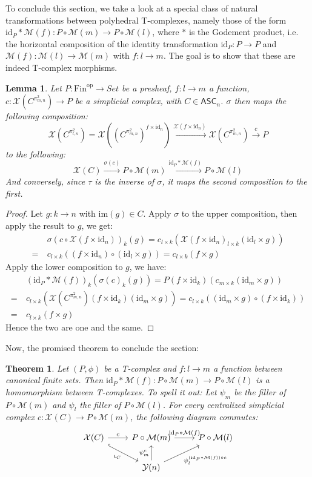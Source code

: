 \documentclass{article}
\newtheorem{theorem}{Theorem}[subsection]
\newtheorem{lemma}{Lemma}[subsection]
\theoremstyle{remark}
\theoremstyle{definition}
\newcommand{\Fin}{\mathrm{Fin}}
\newcommand{\op}{\mathrm{op}}
\newcommand{\ASC}{\mathsf{ASC}}
\newcommand{\im}{\mathrm{im}}
\newcommand{\id}{\mathrm{id}}
\newcommand{\Y}{\mathcal Y}
\newcommand{\X}{\mathcal X}
\newcommand{\M}{\mathcal M}
\begin{document}
	To conclude this section, we take a look at a special class of natural transformations between polyhedral T-complexes, namely those of the form $\id_P*\M(f):P\circ\M(m)\to P\circ\M(l)$, where $*$ is the Godement product, i.e. the horizontal composition of the identity transformation $\id_P:P\to P$ and $\M(f):\M(l)\to\M(m)$ with $f:l\to m$. The goal is to show that these are indeed T-complex morphisms.
	\begin{lemma}\label{sigexch}
		Let $P:\Fin^\op\to Set$ be a presheaf, $f:l\to m$ a function, $c:\X(C^{\pi^2_{m,n}})\to P$ be a simplicial complex, with $C\in\ASC_n$. $\sigma$ then maps the following composition:
		\[\X(C^{\pi^2_{l,n}})=\X((C^{\pi^2_{m,n}})^{f\times\id_n})\xrightarrow{\X(f\times\id_n)}\X(C^{\pi^2_{m,n}})\xrightarrow{c}P\]
		to the following:
		\[\X(C)\xrightarrow{\sigma(c)}P\circ\M(m)\xrightarrow{\id_P*\M(f)}P\circ\M(l)\]
		And conversely, since $\tau$ is the inverse of $\sigma$, it maps the second composition to the first.
	\end{lemma}
	\begin{proof}
		Let $g:k\to n$ with $\im(g)\in C$. Apply $\sigma$ to the upper composition, then apply the result to $g$, we get:
		\begin{align*}
			&\sigma(c\circ\X(f\times\id_n))_k(g)=c_{l\times k}(\X(f\times\id_n)_{l\times k}(\id_l\times g))\\
			=\ &c_{l\times k}((f\times\id_n)\circ(\id_l\times g))=c_{l\times k}(f\times g)
		\end{align*}
		Apply the lower composition to $g$, we have:
		\begin{align*}
			&(\id_P*\M(f))_k(\sigma(c)_k(g))=P(f\times\id_k)(c_{m\times k}(\id_m\times g))\\
			=\ &c_{l\times k}(\X(C^{\pi^2_{m,n}})(f\times\id_k)(\id_m\times g))=c_{l\times k}((\id_m\times g)\circ(f\times\id_k))\\
			=\ &c_{l\times k}(f\times g)
		\end{align*}
		Hence the two are one and the same.
	\end{proof}
	Now, the promised theorem to conclude the section:
	\begin{theorem}
		Let $(P,\phi)$ be a T-complex and $f:l\to m$ a function between canonical finite sets. Then $\id_P*\M(f):P\circ\M(m)\to P\circ\M(l)$ is a homomorphism between T-complexes. To spell it out: Let $\psi_m$ be the filler of $P\circ\M(m)$ and $\psi_l$ the filler of $P\circ\M(l)$. For every centralized simplicial complex $c:\X(C)\to P\circ\M(m)$, the following diagram commutes:
		\[\begin{tikzcd}
			\X(C)\arrow[hook]{dr}[swap]{\iota_C}\arrow{r}{c}&P\circ\M(m)\arrow{r}{\id_P*\M(f)}&P\circ\M(l)\\
			&\Y(n)\arrow{u}{\psi_m^c}\arrow{ur}[swap]{\psi_l^{(\id_P*\M(f))\circ c}}
		\end{tikzcd}\]
	\end{theorem}
\end{document}
